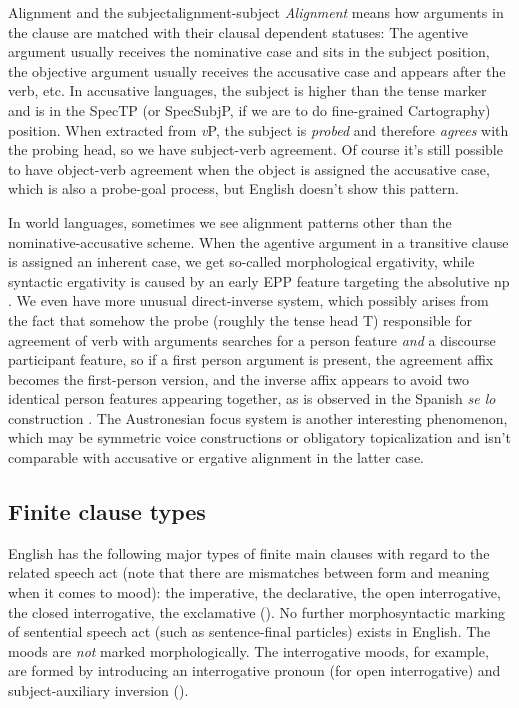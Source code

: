\documentclass[UTF8, a4paper, oneside, scheme=plain]{ctexrep}
\newcommand*{\term}[1]{\emph{#1}}
\newcommand{\corpus}[1]{\emph{#1}}
\newcommand{\vP}{\textit{v}P}
\begin{document}
\begin{theorybox}{Alignment and the subject}{alignment-subject}
    \term{Alignment} means how arguments in the clause 
    are matched with their clausal dependent statuses:
    The agentive argument usually receives the nominative case and sits in the subject position, 
    the objective argument usually receives the accusative case and appears after the verb, etc.
    In accusative languages,
    the subject is higher than the tense marker
    and is in the SpecTP (or SpecSubjP, if we are to do fine-grained Cartography) position.
    When extracted from \vP{},
    the subject is \emph{probed} and therefore \emph{agrees} with the probing head,
    so we have subject-verb agreement.
    Of course it's still possible to have object-verb agreement
    when the object is assigned the accusative case, 
    which is also a probe-goal process,
    but English doesn't show this pattern.

    In world languages, sometimes we see alignment patterns other than the nominative-accusative scheme.
    When the agentive argument in a transitive clause is assigned an inherent case, 
    we get so-called morphological ergativity,
    while syntactic ergativity is caused by an early EPP feature 
    targeting the absolutive \acs{np} \citep{aldridge2008generative}.
    We even have more unusual direct-inverse system,
    which possibly arises from the fact that 
    somehow the probe (roughly the tense head T) responsible for agreement of verb with arguments 
    searches for a person feature \emph{and} a discourse participant feature,
    so if a first person argument is present,
    the agreement affix becomes the first-person version,
    and the inverse affix appears to avoid two identical person features appearing together,
    as is observed in the Spanish \corpus{se lo} construction
    \citep{oxford2017inverse}.
    The Austronesian focus system \citep{chen2019western} is another interesting phenomenon,
    which may be symmetric voice constructions or obligatory topicalization 
    and isn't comparable with accusative or ergative alignment in the latter case.
\end{theorybox}

\subsection{Finite clause types}

English has the following major types of finite main clauses with regard to the related speech act
(note that there are mismatches between form and meaning when it comes to mood):
the imperative, the declarative, 
the open interrogative, the closed interrogative,
the exclamative ().
No further morphosyntactic marking of sentential speech act (such as sentence-final particles)
exists in English.
The moods are \emph{not} marked morphologically.
The interrogative moods, for example, are formed by introducing an interrogative pronoun (for open interrogative)
and subject-auxiliary inversion (). 
\end{document}
